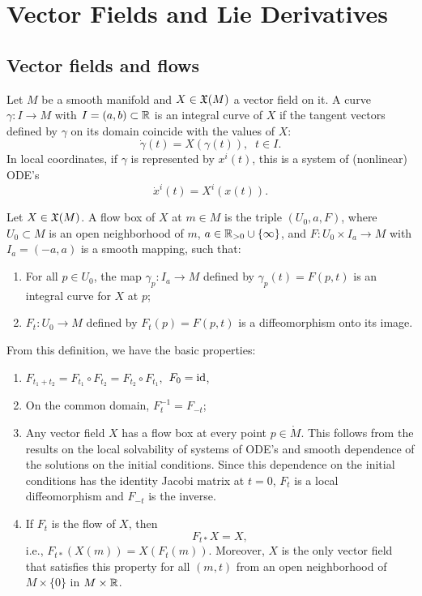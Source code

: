 \clearpage
\chapter{Vector Fields and Lie Derivatives}


\section{Vector fields and flows}


\begin{defn}
Let $M$ be a smooth manifold and $X\in\mathfrak{X}(M)$ a vector field on it. A curve $\gamma:I\to M$ with $I=(a,b)\subset\mathbb{R} $ is an integral curve of $X$ if the tangent vectors defined by $\gamma$ on its domain coincide with the values of $X$: 
\[
\dot\gamma(t)=X(\gamma(t)),\;\;t\in I.
\]
In local coordinates, if $\gamma$ is represented by $x^i(t)$, this is a system of (nonlinear) ODE's
\[
\dot x^i(t)=X^i(x(t)).
\]
\end{defn}
\begin{defn}
Let $X\in\mathfrak{X}(M)$. A flow box of $X$ at $m\in M$ is the triple $(U_0,a,F)$, where $U_0\subset M$ is an open neighborhood of $m$, $a\in \mathbb{R}_{>0}\cup\{\infty\}$, and $F:U_0\times I_a\to M$ with $I_a=(-a,a)$ is a smooth mapping, such that:
\begin{enumerate}
    \item For all $p\in U_0$, the map $\gamma_p:I_a\to M$ defined by $\gamma_p(t)=F(p,t)$ is an integral curve for $X$ at $p$;
    \item $F_t:U_0\to M$ defined by $F_t(p)=F(p,t)$ is a diffeomorphism onto its image.
\end{enumerate}
\end{defn}
From this definition, we have the basic properties:
\begin{enumerate}
    \item $F_{t_1+t_2}=F_{t_1}\circ F_{t_2}=F_{t_2}\circ F_{t_1},$ $F_0=\operatorname{id}$,
    \item On the common domain, $F_t^{-1}=F_{-t}$;
    \item Any vector field $X$ has a flow box at every point $p\in \mathring{M}$. This follows from the results on the local solvability of systems of ODE's and smooth dependence of the solutions on the initial conditions. Since this dependence on the initial conditions has the identity Jacobi matrix at $t=0$, $F_t$ is a local diffeomorphism and $F_{-t}$ is the inverse.
    \item If $F_t$ is the flow of $X$, then \[F_{t\ast}X=X,\] i.e., $F_{t\ast}(X(m))=X(F_t(m))$. Moreover, $X$ is the only vector field that satisfies this property for all $(m,t)$ from an open neighborhood of $M\times\{0\}$ in $M\times\mathbb{R} $.
\end{enumerate}

